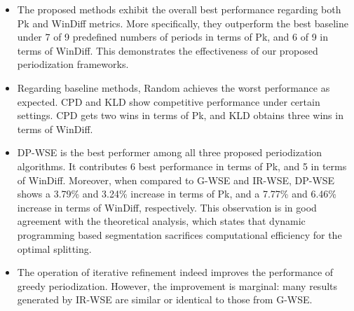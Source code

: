\documentclass[output=paper]{langsci/langscibook}
\begin{document}
\begin{itemize}
\item The proposed methods exhibit the overall best performance regarding both Pk and WinDiff metrics. More specifically, they outperform the best baseline under 7 of 9 predefined numbers of periods in terms of Pk, and 6 of 9 in terms of WinDiff. 
This demonstrates the effectiveness of our proposed periodization frameworks.
\item Regarding baseline methods, Random achieves the worst performance as expected. CPD and KLD show competitive performance under certain settings. CPD gets two wins in terms of Pk, and KLD obtains three wins in terms of WinDiff.
\item DP-WSE is the best performer among all three proposed periodization algorithms.
It contributes 6 best performance in terms of Pk, and 5 in terms of WinDiff.
Moreover, when compared to G-WSE and IR-WSE, DP-WSE shows a 3.79\% and 3.24\% increase in terms of Pk, and a 7.77\% and 6.46\% increase in terms of WinDiff, respectively. 
This observation is in good agreement with the theoretical analysis, which states that dynamic programming based segmentation sacrifices computational efficiency for the optimal splitting.
\item The operation of iterative refinement indeed improves the performance of greedy periodization. However, the improvement is marginal: many results generated by IR-WSE are similar or identical to those from G-WSE.
\end{itemize}
\end{document}

